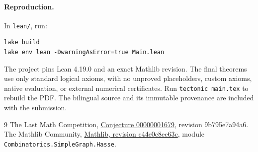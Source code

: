 \documentclass[11pt]{article}
\begin{document}
\paragraph{Reproduction.}
In \texttt{lean/}, run:
\begin{verbatim}
lake build
lake env lean -DwarningAsError=true Main.lean
\end{verbatim}
The project pins Lean 4.19.0 and an exact Mathlib revision. The final
theorems use only standard logical axioms, with no unproved placeholders,
custom axioms, native evaluation, or external numerical certificates.
Run \texttt{tectonic main.tex} to rebuild the PDF. The bilingual source
and its immutable provenance are included with the submission.

\begingroup\raggedright
\begin{thebibliography}{9}
 The Last Math Competition,
\href{https://github.com/The-Last-Math-Competition/The-Last-Math-Competition/blob/9b795e7a94a6076e49a65a6489e1caf9153abd23/conjectures/00000001679.md}{Conjecture 00000001679}, revision 9b795e7a94a6.
 The Mathlib Community,
\href{https://github.com/leanprover-community/mathlib4/commit/c44e0c8ee63ca166450922a373c7409c5d26b00b}{Mathlib, revision c44e0c8ee63c},
module \texttt{Combinatorics.SimpleGraph.Hasse}.
\end{thebibliography}
\endgroup
\end{document}
